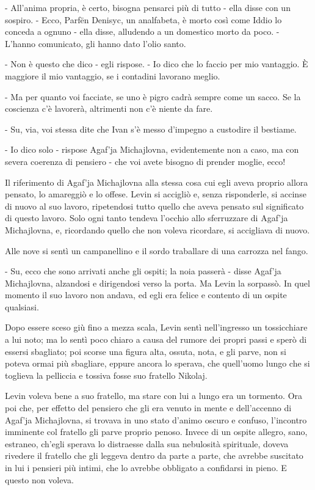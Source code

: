 - All'anima propria, è certo, bisogna pensarci più di tutto - ella disse con un sospiro. - Ecco, Parfën Denisyc, un analfabeta, è morto così come Iddio lo conceda a ognuno - ella disse, alludendo a un domestico morto da poco. - L'hanno comunicato, gli hanno dato l'olio santo. 

- Non è questo che dico - egli rispose. - Io dico che lo faccio per mio vantaggio. È maggiore il mio vantaggio, se i contadini lavorano meglio. 

- Ma per quanto voi facciate, se uno è pigro cadrà sempre come un sacco. Se la coscienza c'è lavorerà, altrimenti non c'è niente da fare. 

- Su, via, voi stessa dite che Ivan s'è messo d'impegno a custodire il bestiame. 

- Io dico solo - rispose Agaf'ja Michajlovna, evidentemente non a caso, ma con severa coerenza di pensiero - che voi avete bisogno di prender moglie, ecco! 

Il riferimento di Agaf'ja Michajlovna alla stessa cosa cui egli aveva proprio allora pensato, lo amareggiò e lo offese. Levin si accigliò e, senza risponderle, si accinse di nuovo al suo lavoro, ripetendosi tutto quello che aveva pensato sul significato di questo lavoro. Solo ogni tanto tendeva l'occhio allo sferruzzare di Agaf'ja Michajlovna, e, ricordando quello che non voleva ricordare, si accigliava di nuovo. 

Alle nove si sentì un campanellino e il sordo traballare di una carrozza nel fango. 

- Su, ecco che sono arrivati anche gli ospiti; la noia passerà - disse Agaf'ja Michajlovna, alzandosi e dirigendosi verso la porta. Ma Levin la sorpassò. In quel momento il suo lavoro non andava, ed egli era felice e contento di un ospite qualsiasi. 

\label{xxxi-2} 

Dopo essere sceso giù fino a mezza scala, Levin sentì nell'ingresso un tossicchiare a lui noto; ma lo sentì poco chiaro a causa del rumore dei propri passi e sperò di essersi sbagliato; poi scorse una figura alta, ossuta, nota, e gli parve, non si poteva ormai più sbagliare, eppure ancora lo sperava, che quell'uomo lungo che si toglieva la pelliccia e tossiva fosse suo fratello Nikolaj. 

Levin voleva bene a suo fratello, ma stare con lui a lungo era un tormento. Ora poi che, per effetto del pensiero che gli era venuto in mente e dell'accenno di Agaf'ja Michajlovna, si trovava in uno stato d'animo oscuro e confuso, l'incontro imminente col fratello gli parve proprio penoso. Invece di un ospite allegro, sano, estraneo, ch'egli sperava lo distraesse dalla sua nebulosità spirituale, doveva rivedere il fratello che gli leggeva dentro da parte a parte, che avrebbe suscitato in lui i pensieri più intimi, che lo avrebbe obbligato a confidarsi in pieno. E questo non voleva. 

